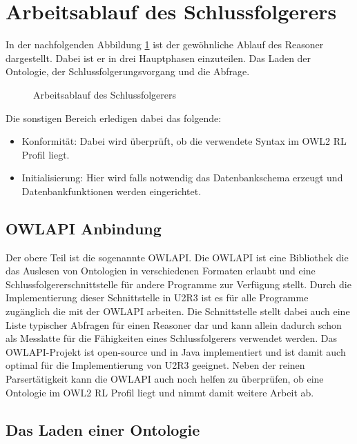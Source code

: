 \section{Arbeitsablauf des Schlussfolgerers}

In der nachfolgenden Abbildung \ref{image-u2r3-workflow} ist der gewöhnliche Ablauf des Reasoner dargestellt. Dabei ist er in drei Hauptphasen einzuteilen. Das Laden der Ontologie, der Schlussfolgerungsvorgang und die Abfrage.

\begin{figure}[htp]
	\caption{Arbeitsablauf des Schlussfolgerers}
	\label{image-u2r3-workflow}
\begin{center}
\end{center}
\end{figure}

Die sonstigen Bereich erledigen dabei das folgende:
\begin{itemize}
  \item Konformität: Dabei wird überprüft, ob die verwendete Syntax im OWL2 RL Profil liegt.
  \item Initialisierung: Hier wird falls notwendig das Datenbankschema erzeugt und Datenbankfunktionen werden eingerichtet.
\end{itemize}


\subsection{OWLAPI Anbindung}

Der obere Teil ist die sogenannte OWLAPI. Die OWLAPI ist eine Bibliothek die das Auslesen von Ontologien in verschiedenen Formaten erlaubt und eine Schlussfolgererschnittstelle für andere Programme zur Verfügung stellt. Durch die Implementierung dieser Schnittstelle in U2R3 ist es für alle Programme zugänglich die mit der OWLAPI arbeiten.
Die Schnittstelle stellt dabei auch eine Liste typischer Abfragen für einen Reasoner dar und kann allein dadurch schon als Messlatte für die Fähigkeiten eines Schlussfolgerers verwendet werden. Das OWLAPI-Projekt ist open-source und in Java implementiert und ist damit auch optimal für die Implementierung von U2R3 geeignet. Neben der reinen Parsertätigkeit kann die OWLAPI auch noch helfen zu überprüfen, ob eine Ontologie im OWL2 RL Profil liegt und nimmt damit weitere Arbeit ab.

\subsection{Das Laden einer Ontologie}

